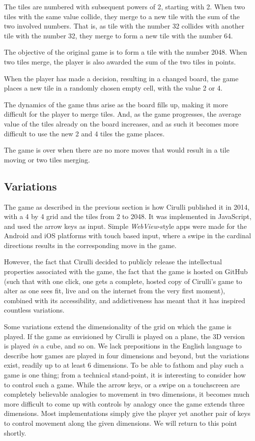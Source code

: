 \documentclass[a4paper, 12pt]{article}
\begin{document}
The tiles are numbered with subsequent powers of 2, starting with
2. When two tiles with the same value collide, they merge to a new
tile with the sum of the two involved numbers. That is, as tile with
the number 32 collides with another tile with the number 32, they
merge to form a new tile with the number 64.

The objective of the original game is to form a tile with the number 2048. When
two tiles merge, the player is also awarded the sum of the two tiles
in points.

When the player has made a decision, resulting in a changed board, the game places a new tile in a randomly
chosen empty cell, with the value 2 or 4.

The dynamics of the game thus arise as the board fills up, making it
more difficult for the player to merge tiles. And, as the game
progresses, the average value of the tiles already on the board
increases, and as such it becomes more difficult to use the new 2 and
4 tiles the game places.

The game is over when there are no more moves that would result in a
tile moving or two tiles merging.

\subsection{Variations}

The game as described in the previous section is how Cirulli published
it in 2014, with a 4 by 4 grid and the tiles from 2 to 2048. It was
implemented in JavaScript, and used the arrow keys as input. Simple
\emph{WebView}-style apps were made for the Android and iOS platforms
with touch based input, where a swipe in the cardinal directions
results in the corresponding move in the game.

However, the fact that Cirulli decided to publicly release the
intellectual properties associated with the game, the fact that the
game is hosted on GitHub (such that with one click, one gets a
complete, hosted copy of Cirulli's game to alter as one sees fit, live
and on the internet from the very first moment), combined with its
accessibility, and addictiveness has meant that it has inspired
countless variations.

Some variations extend the dimensionality of the grid on which the
game is played. If the game as envisioned by Cirulli is played on a
plane, the 3D version is played \emph{in} a cube, and so on. We lack
prepositions in the English language to describe how games are played
in four dimensions and beyond, but the variations exist, readily up to
at least 6 dimensions. To be able to fathom and play such a game is
one thing; from a technical stand-point, it is interesting to consider
how to control such a game. While the arrow keys, or a swipe on a
touchscreen are completely believable analogies to movement in two
dimensions, it becomes much more difficult to come up with controls by
analogy once the game extends three dimensions. Most implementations
simply give the player yet another pair of keys to control movement
along the given dimensions. We will return to this point shortly.
\end{document}

